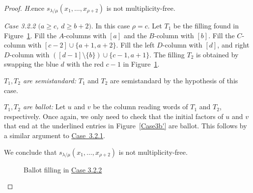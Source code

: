 \documentclass[ALCO,ThmDefs,Unicode,epreuves]{cedram}
\let\hypertargeta\hypertarget %
\let\hyperlinka\hyperlink %
\newenvironment{Case}[1]{\par\vskip2pt\noindent%
\emph{#1}.}{\vskip2pt}
\begin{document}
\begin{proof}
\begin{Case}
Hence $s_{\lambda/\mu}(x_1,\ldots,x_{\rho+2})$ is not multiplicity-free.


\end{Case}

\begin{Case}
{\hypertargeta{theo3.13_case3.2.2}{Case 3.2.2} $(a\geq c$, $d\geq b+2)$} 
In this case $\rho = c$. Let $T_1$ be the filling found in Figure~\ref{Case3b''}. Fill the $A$-columns with $[a]$ and the $B$-column with $[b]$. Fill the $C$-column with $[c-2]\cup \{ a+1, a+2\}$. Fill the left $D$-column with $[d]$, and right $D$-column with $([d-1]\setminus\{b\})\cup\{ c-1, a+1\}$. The filling $T_2$ is obtained by swapping the blue $d$ with the red $c-1$ in Figure~\ref{Case3b''}.

\emph{$T_1,T_2$ are semistandard:} $T_1$ and $T_2$ are semistandard by the hypothesis of this case.

\emph{$T_1,T_2$ are ballot:} Let $u$ and $v$ be the column reading words of $T_1$ and $T_2$, respectively. Once again, we only need to check that the initial factors of $u$ and $v$ that end at the underlined entries in Figure~\ref{Case3b'} are ballot. This follows by a similar argument to \hyperlinka{theo3.13_case3.2.1}{Case~3.2.1}.

We conclude that $s_{\lambda/\mu}(x_1,\ldots,x_{\rho+2})$ is not multiplicity-free.

\begin{figure}[htb]\centering
 \caption[Ballot filling in Case 3.2.2]{Ballot filling in \hyperlinka{theo3.13_case3.2.2}{Case 3.2.2}}
 \label{Case3b''}
\end{figure}



\end{Case}
\end{proof}
\end{document}
